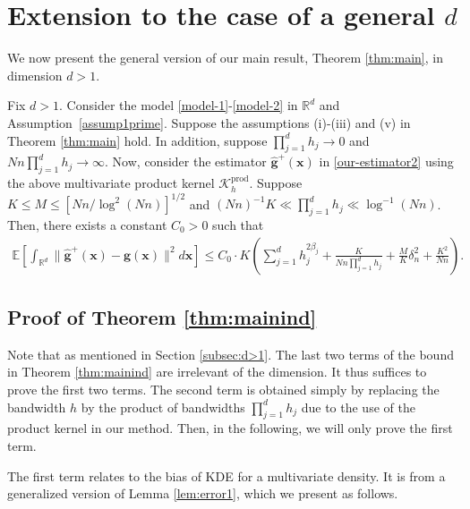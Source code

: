 \documentclass[preprint,11pt]{article}
\newcommand{\mbb}{\mathbb}
\newcommand{\mcal}{\mathcal}
\numberwithin{equation}{section}
\begin{document}
\section{Extension to the case of a general $d$} \label{supp:extension}
We now present the general version of our main result, Theorem \ref{thm:main}, in dimension $d>1$. 
\begin{thm} \label{thm:mainind}
Fix $d>1$. Consider the model \eqref{model-1}-\eqref{model-2} in $\mbb{R}^d$ and Assumption~\ref{assump1prime}. Suppose the assumptions (i)-(iii) and (v) in Theorem \ref{thm:main} hold. In addition, suppose $\prod_{j=1}^d h_j\rightarrow 0$ and $Nn\prod_{j=1}^d h_j\rightarrow\infty$. Now, consider the estimator $\widehat{\boldsymbol g}^+(\bm{x})$ in \eqref{our-estimator2} using the above multivariate product kernel $\mcal{K}_h^{\text{prod}}$. Suppose $K\leq M\leq [Nn/\log^2(Nn)]^{1/2}$ and $ (Nn)^{-1}K\ll \prod_{j=1}^d h_j\ll \log^{-1}(Nn)$. 
    Then, there exists a constant $C_0>0$ such that 
\begin{align*}
\mbb{E}\left[\int_{\mbb{R}^d} \|\widehat{\bm{g}}^+(\bm{x})-\bm{g}(\bm{x})\|^2d\bm{x}\right]\le C_0 \cdot K\left( \sum_{j=1}^d h_j^{2\beta_j}  + \frac{K}{Nn\prod_{j=1}^d h_j}+\frac{M}{K}\delta_n^2  +  \frac{K^2}{Nn} \right). 
\end{align*}
\end{thm}

\subsection{Proof of Theorem \ref{thm:mainind}}
Note that as mentioned in Section \ref{subsec:d>1}. The last two terms of the bound in Theorem \ref{thm:mainind} are irrelevant of the dimension. It thus suffices to prove the first two terms. The second term is obtained simply by replacing the bandwidth $h$ by the product of bandwidths $\prod_{j=1}^d h_j$ due to the use of the product kernel in our method. Then, in the following, we will only prove the first term.

The first term relates to the bias of KDE for a multivariate density. It is from a generalized version of Lemma \ref{lem:error1}, which we present as follows.
\end{document}
